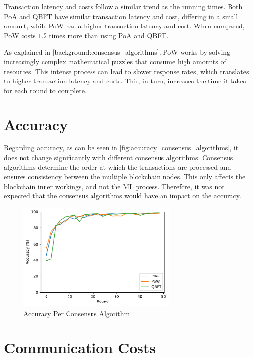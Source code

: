Transaction latency and costs follow a similar trend as the running times. Both PoA and QBFT have similar transaction latency and cost, differing in a small amount, while PoW has a higher transaction latency and cost. When compared, PoW costs $1.2$ times more than using PoA and QBFT.

As explained in \autoref{background:consensus_algorithms}, PoW works by solving increasingly complex mathematical puzzles that consume high amounts of resources. This intense process can lead to slower response rates, which translates to higher transaction latency and costs. This, in turn, increases the time it takes for each round to complete.

\section{Accuracy}

Regarding accuracy, as can be seen in \autoref{fig:accuracy_consensus_algorithms}, it does not change significantly with different consensus algorithms. Consensus algorithms determine the order at which the transactions are processed and ensures consistency between the multiple blockchain nodes. This only affects the blockchain inner workings, and not the ML process. Therefore, it was not expected that the consensus algorithms would have an impact on the accuracy.

\begin{figure}[!ht]
    \centering
    \centering
    \includegraphics[width=0.7\textwidth]{graphics/consensus/accuracy.pdf}
    \caption{Accuracy Per Consensus Algorithm}
    \label{fig:accuracy_consensus_algorithms}
\end{figure}

\section{Communication Costs}

